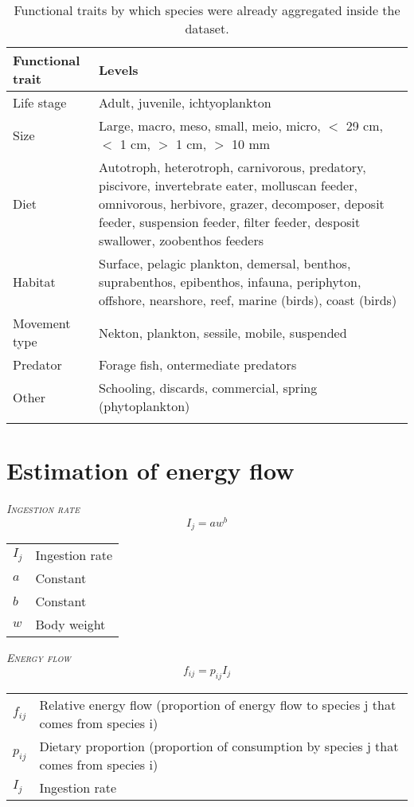 \documentclass{article}
\makeatletter
\newenvironment{conditions}
  {\par\vspace{\abovedisplayskip}\noindent\begin{tabular}{>{$}l<{$} @{${}={}$} l}}
  {\end{tabular}\par\vspace{\belowdisplayskip}}
\makeatother
\begin{document}
\begin{table}[htbp]
    \centering
        \begin{tabularx}{\textwidth}{l X }
            \hline
            Functional trait & Levels \\
            \hline
	        Life stage & Adult, juvenile, ichtyoplankton \\
	        Size &  Large, macro, meso, small, meio, micro, $<$ 29 cm, $<$ 1 cm, $>$ 1 cm, $>$ 10 mm \\
	        Diet & Autotroph, heterotroph, carnivorous, predatory, piscivore, invertebrate eater, molluscan feeder, omnivorous, herbivore, grazer, decomposer, deposit feeder, suspension feeder, filter feeder, desposit swallower, zoobenthos feeders \\
	        Habitat & Surface, pelagic plankton, demersal, benthos, suprabenthos, epibenthos, infauna, periphyton, offshore, nearshore, reef, marine (birds), coast (birds) \\
	        Movement type & Nekton, plankton, sessile, mobile, suspended \\
	        Predator & Forage fish, ontermediate predators \\
	        Other & Schooling, discards, commercial, spring (phytoplankton) \\
	        \hline
	            \label{tab:traits_in_dataset}
	            \caption{Functional traits by which species were already aggregated inside the dataset.}
	    \end{tabularx}
\end{table}





\section{Estimation of energy flow \citep{Yodzis1999}}

\noindent \textrm{\textsc{\textsl{Ingestion rate}}} 
\begin{equation}
I_j=aw^b
\end{equation}
\begin{conditions}
I_j & Ingestion rate \\
a & Constant \\
b & Constant \\
w & Body weight \\
\end{conditions}

\bigskip
\noindent \textrm{\textsc{\textsl{Energy flow}}} 
\begin{equation}
f_{ij}=p_{ij}I_j
\end{equation}
\begin{conditions}
f_{ij} & Relative energy flow (proportion of energy flow to species j that comes from species i)\\
p_{ij} & Dietary proportion (proportion of consumption by species j that comes from species i) \\
I_j & Ingestion rate \\
\end{conditions}
\end{document}
